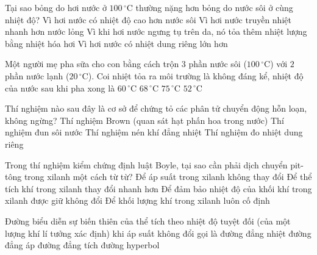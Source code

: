 	\begin{ex}%
		Tại sao bỏng do hơi nước ở $100\,^\circ\text{C}$ thường nặng hơn bỏng do nước sôi ở cùng nhiệt độ?
		\choice
		{Vì hơi nước có nhiệt độ cao hơn nước sôi}
		{Vì hơi nước truyền nhiệt nhanh hơn nước lỏng}
		{\True Vì khi hơi nước ngưng tụ trên da, nó tỏa thêm nhiệt lượng bằng nhiệt hóa hơi}
		{Vì hơi nước có nhiệt dung riêng lớn hơn}
	\end{ex}

	\begin{ex}%
		Một người mẹ pha sữa cho con bằng cách trộn $3$ phần nước sôi ($100\,^\circ\text{C}$) với $2$ phần nước lạnh ($20\,^\circ\text{C}$). Coi nhiệt tỏa ra môi trường là không đáng kể, nhiệt độ của nước sau khi pha xong là
		\choice
		{$60\,^\circ\text{C}$}
		{\True $68\,^\circ\text{C}$}
		{$75\,^\circ\text{C}$}
		{$52\,^\circ\text{C}$}
	\end{ex}

	\begin{ex}%
		Thí nghiệm nào sau đây là cơ sở để chứng tỏ các phân tử chuyển động hỗn loạn, không ngừng?
		\choice
		{\True Thí nghiệm Brown (quan sát hạt phấn hoa trong nước)}
		{Thí nghiệm đun sôi nước}
		{Thí nghiệm nén khí đẳng nhiệt}
		{Thí nghiệm đo nhiệt dung riêng}
	\end{ex}

	\begin{ex}%
		Trong thí nghiệm kiểm chứng định luật Boyle, tại sao cần phải dịch chuyển pit-tông trong xilanh một cách từ từ?
		\choice
		{Để áp suất trong xilanh không thay đổi}
		{Để thể tích khí trong xilanh thay đổi nhanh hơn}
		{\True Để đảm bảo nhiệt độ của khối khí trong xilanh được giữ không đổi}
		{Để khối lượng khí trong xilanh luôn cố định}
	\end{ex}

	\begin{ex}%
		Đường biểu diễn sự biến thiên của thể tích theo nhiệt độ tuyệt đối (của một lượng khí lí tưởng xác định) khi áp suất không đổi gọi là
		\choice
		{đường đẳng nhiệt}
		{\True đường đẳng áp}
		{đường đẳng tích}
		{đường hyperbol}
	\end{ex}

